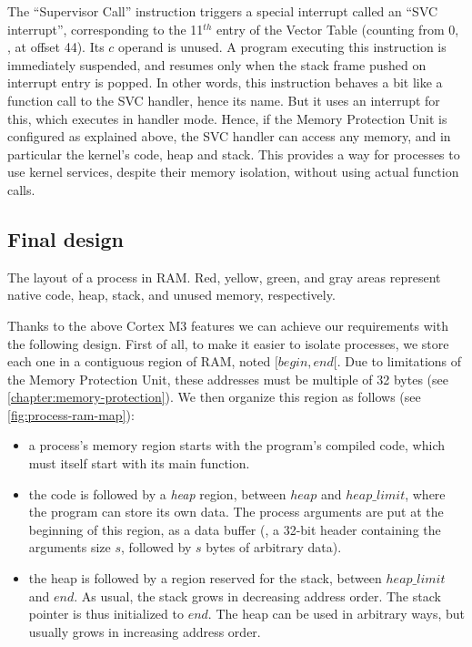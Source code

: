 \begin{Paragraph}
\end{Paragraph}

The ``Supervisor Call'' instruction triggers a special interrupt called an
``SVC interrupt'', corresponding to the 11$^{th}$ entry of the Vector Table
(counting from 0, \ie, at offset 44). Its $c$ operand is unused. A program
executing this instruction is immediately suspended, and resumes only when the
stack frame pushed on interrupt entry is popped. In other words, this
instruction behaves a bit like a function call to the SVC handler, hence its
name. But it uses an interrupt for this, which executes in handler mode. Hence,
if the Memory Protection Unit is configured as explained above, the SVC handler
can access any memory, and in particular the kernel's code, heap and stack.
This provides a way for processes to use kernel services, despite their
memory isolation, without using actual function calls.

\subsection{Final design}

\begin{Figure}
  

  \caption{The layout of a process in RAM.  Red, yellow, green, and gray areas
  represent native code, heap, stack, and unused memory,
  respectively.}\label{fig:process-ram-map}
\end{Figure}

Thanks to the above Cortex M3 features we can achieve our requirements with the
following design. First of all, to make it easier to isolate processes, we
store each one in a contiguous region of RAM, noted $[\mathit{begin},
\mathit{end}[$. Due to limitations of the Memory Protection Unit, these
addresses must be multiple of 32 bytes (see \cref{chapter:memory-protection}).
We then organize this region as follows (see \cref{fig:process-ram-map}):
\begin{itemize}
  \item a process's memory region starts with the program's compiled code,
  which must itself start with its main function.

  \item the code is followed by a {\em heap} region, between $\mathit{heap}$
  and $\mathit{heap\_limit}$, where the program can store its own data. The
  process arguments are put at the beginning of this region, as a data buffer
  (\ie, a 32-bit header containing the arguments size $s$, followed by $s$
  bytes of arbitrary data).

  \item the heap is followed by a region reserved for the stack, between
  $\mathit{heap\_limit}$ and $\mathit{end}$. As usual, the
  stack grows in decreasing address order. The stack pointer is thus
  initialized to $\mathit{end}$. The heap can be used in arbitrary
  ways, but usually grows in increasing address order.
\end{itemize}

